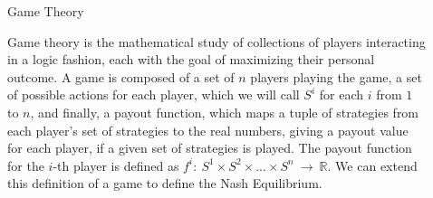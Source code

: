 \documentclass[final]{beamer}
\newlength{\sepwid}
\newlength{\onecolwid}
\newlength{\twocolwid}
\begin{document}
\begin{frame}[t]
\begin{columns}[t]
\begin{column}{\sepwid}\end{column} %

\begin{column}{\twocolwid} %

\begin{columns}[t, totalwidth=\twocolwid] %

\begin{column}{\onecolwid}\vspace{-.6in} %


\begin{block}{Game Theory}

Game theory is the mathematical study of collections of players interacting in a logic fashion, each with the goal of maximizing their personal outcome.
\newline\newline
A game is composed of a set of $n$ players playing the game, a set of possible actions for each player, which we will call $S^i$ for each $i$ from $1$ to $n$, and finally, a payout function, which maps a tuple of strategies from each player's set of strategies to the real numbers, giving a payout value for each player, if a given set of strategies is played. The payout function for the $i$-th player is defined as $f^i: \ S^1 \times S^2 \times ... \times S^n \ \rightarrow \ \mathbb{R}$.
We can extend this definition of a game to define the Nash Equilibrium.

\end{block}


\end{column} %



\begin{column}{\onecolwid}\vspace{-.6in} %



\end{column}
\end{columns}
\end{column}
\end{columns}
\end{frame}
\end{document}
